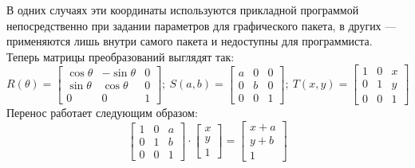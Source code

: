 \documentclass[a4paper, 14pt]{extarticle}
\begin{document}
В одних случаях эти координаты используются прикладной программой непосредственно при задании параметров для графического пакета, в других — применяются лишь внутри самого пакета и недоступны для программиста.
Теперь матрицы преобразований выглядят так:
$$
R(\theta)=\begin{bmatrix}
	\cos{\theta} & -\sin{\theta} & 0 \\
	\sin{\theta} & \cos{\theta} & 0 \\
	0 & 0 & 1
\end{bmatrix}; \ 
S(a,b) = \begin{bmatrix}
	a & 0 & 0 \\
	0 & b & 0 \\
	0 & 0 & 1
\end{bmatrix}; \
T(x,y) = \begin{bmatrix}
	1 & 0 & x \\
	0 & 1 & y \\
	0 & 0 & 1
\end{bmatrix}
$$
Перенос работает следующим образом:
$$
\begin{bmatrix}
	1 & 0 & a \\
	0 & 1 & b \\
	0 & 0 & 1
\end{bmatrix} \cdot \begin{bmatrix}
	x \\ y \\ 1
\end{bmatrix} = \begin{bmatrix}
	 x + a \\ y + b \\ 1
\end{bmatrix}
$$
\end{document}
